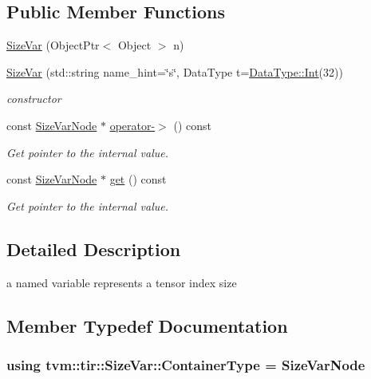 \subsection*{Public Member Functions}
\begin{DoxyCompactItemize}
\item 
\hyperlink{classtvm_1_1tir_1_1SizeVar_ac470249315d9e395ad581d35dd5dcb05}{Size\+Var} (Object\+Ptr$<$ Object $>$ n)
\item 
\hyperlink{classtvm_1_1tir_1_1SizeVar_ab21b06f0b20c25578afc631f061cabe0}{Size\+Var} (std\+::string name\+\_\+hint=\char`\"{}s\char`\"{}, Data\+Type t=\hyperlink{classtvm_1_1runtime_1_1DataType_ab45f13dd70d982d9f977c79b6f7fac98}{Data\+Type\+::\+Int}(32))
\begin{DoxyCompactList}\small\item\em constructor \end{DoxyCompactList}\item 
const \hyperlink{classtvm_1_1tir_1_1SizeVarNode}{Size\+Var\+Node} $\ast$ \hyperlink{classtvm_1_1tir_1_1SizeVar_a06c7fc40327fa00ebe625872b8587b0a}{operator-\/$>$} () const 
\begin{DoxyCompactList}\small\item\em Get pointer to the internal value. \end{DoxyCompactList}\item 
const \hyperlink{classtvm_1_1tir_1_1SizeVarNode}{Size\+Var\+Node} $\ast$ \hyperlink{classtvm_1_1tir_1_1SizeVar_a0dbc4e08fa1f13432b8e1ca0f4c43cfd}{get} () const 
\begin{DoxyCompactList}\small\item\em Get pointer to the internal value. \end{DoxyCompactList}\end{DoxyCompactItemize}


\subsection{Detailed Description}
a named variable represents a tensor index size 

\subsection{Member Typedef Documentation}
\subsubsection[{\texorpdfstring{Container\+Type}{ContainerType}}]{\setlength{\rightskip}{0pt plus 5cm}using {\bf tvm\+::tir\+::\+Size\+Var\+::\+Container\+Type} =  {\bf Size\+Var\+Node}}\hypertarget{classtvm_1_1tir_1_1SizeVar_a3782dc98fd7c52a22a022ae25d5159a0}{}\label{classtvm_1_1tir_1_1SizeVar_a3782dc98fd7c52a22a022ae25d5159a0}


